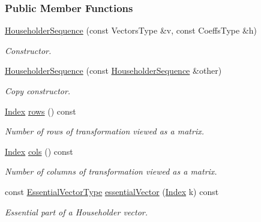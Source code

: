 \subsubsection*{Public Member Functions}
\begin{DoxyCompactItemize}
\item 
\hyperlink{group___householder___module_af6aeede87ed8dac452f4fa8b4f45c3f2}{Householder\+Sequence} (const Vectors\+Type \&v, const Coeffs\+Type \&h)
\begin{DoxyCompactList}\small\item\em Constructor. \end{DoxyCompactList}\item 
\mbox{\label{group___householder___module_aa4b1b93fff4d5c79342974d9d2a9eec8}} 
\hyperlink{group___householder___module_aa4b1b93fff4d5c79342974d9d2a9eec8}{Householder\+Sequence} (const \hyperlink{group___householder___module_class_eigen_1_1_householder_sequence}{Householder\+Sequence} \&other)
\begin{DoxyCompactList}\small\item\em Copy constructor. \end{DoxyCompactList}\item 
\hyperlink{group___core___module_a554f30542cc2316add4b1ea0a492ff02}{Index} \hyperlink{group___householder___module_a6eaafe2460930d1f4aa67d6e577b71f0}{rows} () const
\begin{DoxyCompactList}\small\item\em Number of rows of transformation viewed as a matrix. \end{DoxyCompactList}\item 
\hyperlink{group___core___module_a554f30542cc2316add4b1ea0a492ff02}{Index} \hyperlink{group___householder___module_adcdcdd92a77810ce4bdd2b1282fe6a75}{cols} () const
\begin{DoxyCompactList}\small\item\em Number of columns of transformation viewed as a matrix. \end{DoxyCompactList}\item 
const \hyperlink{group___core___module_class_eigen_1_1_block}{Essential\+Vector\+Type} \hyperlink{group___householder___module_ac91cf37b0cbea9e504c89e021fd289ba}{essential\+Vector} (\hyperlink{group___core___module_a554f30542cc2316add4b1ea0a492ff02}{Index} k) const
\begin{DoxyCompactList}\small\item\em Essential part of a Householder vector. \end{DoxyCompactList}\item 

\end{DoxyCompactItemize}
